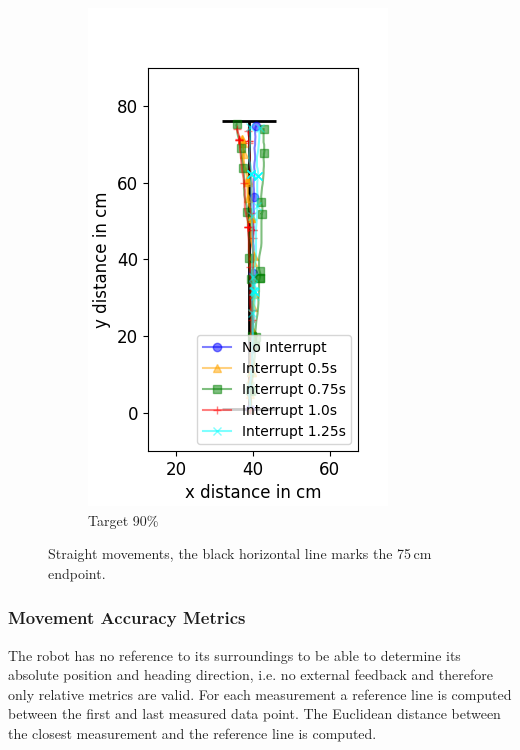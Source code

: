 \begin{figure}
\begin{subfigure}[b]{0.32\textwidth}
		\includegraphics[width=\textwidth]{pics/straight_90.png}
		\caption{Target 90\%}
		\label{fig:stra_exp3}
	\end{subfigure}
	\caption{Straight movements, the black horizontal line marks the 75\,cm endpoint.}
	\label{fig:straight_movements}
\end{figure}

\subsubsection{Movement Accuracy Metrics}

The robot has no reference to its surroundings to be able to determine its absolute position and heading direction, i.e. no external feedback and therefore only relative metrics are valid.
For each measurement a reference line is computed between the first and last measured data point.
The Euclidean distance between the closest measurement and the reference line is computed.

